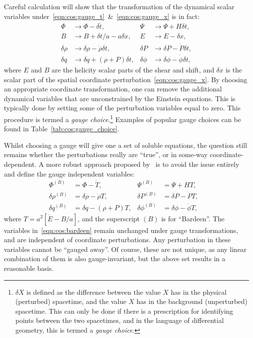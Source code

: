 Careful calculation will show that the transformation of the dynamical scalar variables under~\eqref{eqn:cos:gauge_t}~\&~\eqref{eqn:cos:gauge_x} is in fact:
\begin{align}
  \Phi &\rightarrow \Phi - \delta \dot{t}, &
  \Psi &\rightarrow \Psi +H \delta t,  \nonumber\\
  B &\rightarrow B + \delta t/a - a\delta \dot{x}, &
  E &\rightarrow E - \delta x, \nonumber\\
  \delta\rho &\rightarrow \delta\rho - \dot{\rho}\delta t, &
  \delta P &\rightarrow \delta P - \dot{P}\delta t, \nonumber\\
  \delta q &\rightarrow \delta q + (\rho+P)\delta t,&
  \delta \phi &\rightarrow \delta \phi - \dot{\phi}\delta t,
\end{align}
where \(E\) and \(B\) are the helicity scalar parts of the shear and shift, and $\delta x$ is the scalar part of the spatial coordinate perturbation~\eqref{eqn:cos:gauge_x}.
By choosing an appropriate coordinate transformation, one can remove the additional dynamical variables that are unconstrained by the Einstein equations. This is typically done by setting some of the perturbation variables equal to zero. This procedure is termed a {\em gauge choice}.\footnote{\(\delta X\) is defined as the difference between the value \(X\) has in the physical (perturbed) spacetime, and the value \(X\) has in the background (unperturbed) spacetime. This can only be done if there is a prescription for identifying points between the two spacetimes, and in the language of differential geometry, this is termed a {\em gauge choice}.}
Examples of popular gauge choices can be found in Table~\ref{tab:cos:gauge_choice}.

Whilst choosing a gauge will give one a set of soluble equations, the question still remains whether the perturbations really are ``true'', or in some-way coordinate-dependent. A more robust approach proposed by~\cite{Bardeen_GI} is to avoid the issue entirely and define the gauge independent variables:
\begin{align}
  \Phi^{(B)} &=  \Phi - \dot{T}, &
  \Psi^{(B)} &=  \Psi + HT, \nonumber \\
  \delta\rho^{(B)} &= \delta\rho - \dot{\rho}T, &
  \delta P^{(B)} &= \delta P - \dot{P}T, & \nonumber\\
  \delta q^{(B)} &= \delta q - (\rho + P)T, &
  \delta \phi^{(B)} &= \delta \phi - \dot{\phi}T, 
  \label{eqn:cos:bardeen}
\end{align}
where \(T = a^2[\dot{E}-B/a]\), and the superscript \((B)\) is for ``Bardeen''. The variables in~\eqref{eqn:cos:bardeen} remain unchanged under gauge transformations, and are independent of coordinate perturbations. Any perturbation in these variables cannot be ``gauged away''. Of course, these are not unique, as any linear combination of them is also gauge-invariant, but the above set results in a reasonable basis. 

